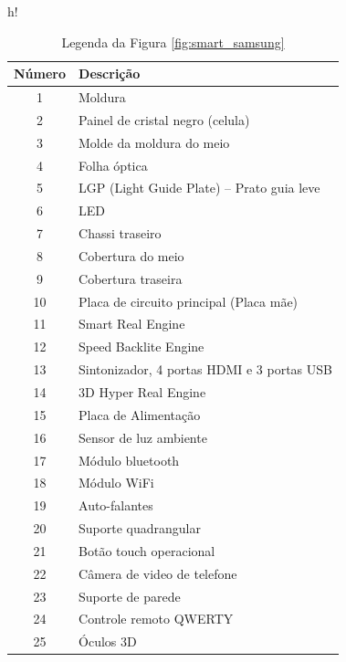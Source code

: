 \begin{table}{h!}
	\centering
	\caption{Legenda da Figura \ref{fig:smart_samsung}}
	\label{tab:smart}
	\begin{tabular}{c l}
		\hline
		Número & Descrição \\
		\hline
		1 & Moldura \\
		2 & Painel de cristal negro (celula) \\
		3 & Molde da moldura do meio \\
		4 & Folha óptica \\
		5 & LGP (Light Guide Plate) -- Prato guia leve \\
		6 & LED \\
		7 & Chassi traseiro \\
		8 & Cobertura do meio \\
		9 & Cobertura traseira \\
		10 & Placa de circuito principal (Placa mãe) \\
		11 & Smart Real Engine \\
		12 & Speed Backlite Engine \\
		13 & Sintonizador, 4 portas HDMI e 3 portas USB \\
		14 & 3D Hyper Real Engine \\
		15 & Placa de Alimentação \\
		16 & Sensor de luz ambiente \\
		17 & Módulo bluetooth \\
		18 & Módulo WiFi \\
		19 & Auto-falantes \\
		20 & Suporte quadrangular \\
		21 & Botão touch operacional \\
		22 & Câmera de video de telefone \\
		23 & Suporte de parede \\
		24 & Controle remoto QWERTY \\
		25 & Óculos 3D \\
		\hline
	\end{tabular}
\end{table}
